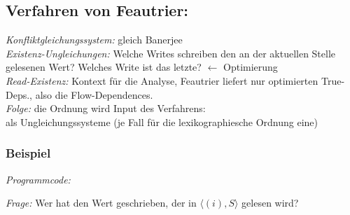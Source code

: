 \subsection{Verfahren von Feautrier:}
\textit{Konfliktgleichungssystem:} gleich Banerjee\\
\textit{Existenz-Ungleichungen:} Welche \glqq Writes \grqq schreiben den an der aktuellen Stelle gelesenen Wert? Welches \glqq Write \grqq ist das letzte? $\leftarrow$ Optimierung\\
\textit{Read-Existenz:} Kontext für die Analyse, Feautrier liefert nur optimierten True-Deps., also die Flow-Dependences.\\
\textit{Folge:} die Ordnung wird Input des Verfahrens:\\
als Ungleichungssysteme (je Fall für die lexikographiesche Ordnung eine)

\subsubsection{Beispiel}
\textit{Programmcode:}

\begin{procedure}
\SetLine
{}
\end{procedure}

\textit{Frage:} Wer hat den Wert geschrieben, der in $\langle (i),S \rangle$ gelesen wird?\\


